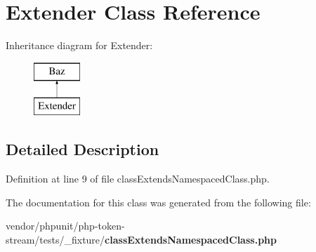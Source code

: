 \section{Extender Class Reference}
\label{class_other_1_1_space_1_1_extender}
Inheritance diagram for Extender\+:\begin{figure}[H]
\begin{center}
\leavevmode
\includegraphics[height=2.000000cm]{class_other_1_1_space_1_1_extender}
\end{center}
\end{figure}


\subsection{Detailed Description}


Definition at line 9 of file class\+Extends\+Namespaced\+Class.\+php.



The documentation for this class was generated from the following file\+:\begin{DoxyCompactItemize}
\item 
vendor/phpunit/php-\/token-\/stream/tests/\+\_\+fixture/{\bf class\+Extends\+Namespaced\+Class.\+php}\end{DoxyCompactItemize}
